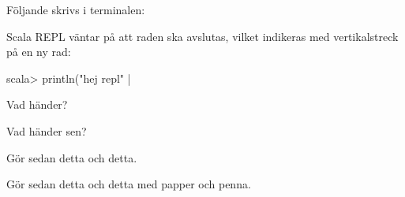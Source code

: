 

\BasicTasks %

\Task 

\Subtask Följande skrivs i terminalen: 

\Subtask Scala REPL väntar på att raden ska avslutas, vilket indikeras med vertikalstreck \code{|} på en ny rad:
\begin{REPL}
scala> println("hej repl"
     | 
\end{REPL}

\Task  

\Subtask Vad händer?

\Subtask Vad händer sen?

\Task Gör sedan detta och detta. 

\Task\Pen Gör sedan detta och detta med papper och penna.

\ExtraTasks %
\lipsum[2]


\AdvancedTasks %
\lipsum[2]
